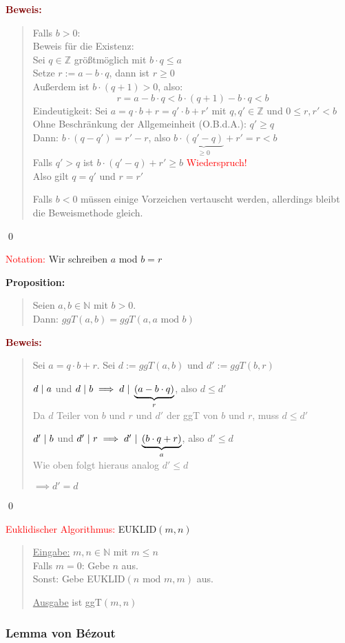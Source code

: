 \documentclass{article}
\newcommand{\smsp}{\phantom{\hspace{3px}}}
\newcommand{\red}[1]{\textcolor{red}{#1}}
\newcommand{\gray}[1]{\textcolor{gray}{#1}}
\newcommand{\dgr}[1]{\textcolor{dgr}{#1}}
\newcommand{\maroon}[1]{\textcolor{maroon}{#1}}
\newcommand{\prop}[1]{\dgr{\textbf{Proposition: }}\begin{quote}#1\end{quote}}
\newcommand{\pr}[1]{\maroon{\textbf{Beweis: }}\begin{quote}#1\end{quote}\qed}
\newcommand{\N}{\mathbb{N}}
\newcommand{\Z}{\mathbb{Z}}
\renewcommand{\st}{\smsp | \smsp}
\begin{document}
\pr{
    Falls $b > 0$:\\
    Beweis für die Existenz:\\
    Sei $q \in \Z$ größtmöglich mit $b \cdot q \leq a$\\
    Setze $r := a - b \cdot q$, dann ist $r \geq 0$\\
    Außerdem ist $b \cdot (q+1) > 0$, also:
    \[
        r = a - b \cdot q < b \cdot (q+1) - b \cdot q < b
    \]
    Eindeutigkeit: Sei $a = q \cdot b + r = q' \cdot b + r'$ mit $q, q' \in \Z$ und $0 \leq r,r' < b$\\
    Ohne Beschränkung der Allgemeinheit (O.B.d.A.): $q' \geq q$\\
    Dann: $b \cdot (q - q') = r' - r$, also $b \cdot \underbrace{(q' - q)}_{\geq 0} + r' = r < b$\\
    Falls $q' > q$ ist $b \cdot (q' - q) + r' \geq b$ \red{Wiederspruch!}\\
    Also gilt $q = q'$ und $r = r'$

    Falls $b < 0$ müssen einige Vorzeichen vertauscht werden, allerdings bleibt die Beweismethode gleich.
}

\red{Notation:} Wir schreiben $a$ mod $b = r$

\prop{
    Seien $a,b \in \N$ mit $b > 0$.\\
    Dann: $ggT(a,b) = ggT(a, a \text{ mod } b)$
}
\pr{
    Sei $a = q \cdot b + r$.
    Sei $d := ggT(a,b)$ und $d' := ggT(b,r)$

    $d \st a$ und $d \st b \implies d \st \underbrace{(a - b \cdot q)}_r$, also $d \leq d'$\\
    \gray{Da $d$ Teiler von $b$ und $r$ und $d'$ der ggT von $b$ und $r$, muss $d \leq d'$}
    
    $d' \st b$ und $d' \st r \implies d' \st \underbrace{(b \cdot q + r)}_a$, also $d' \leq d$\\
    \gray{Wie oben folgt hieraus analog $d' \leq d$}

    $\implies d' = d$
}

\red{Euklidischer Algorithmus:} EUKLID$(m,n)$
\begin{quote}
    \underline{Eingabe:} $m,n \in \N$ mit $m \leq n$\\
    Falls $m = 0$: Gebe $n$ aus.\\
    Sonst: Gebe EUKLID$(n \text{ mod } m, m)$ aus.

    \underline{Ausgabe} ist ggT$(m,n)$
\end{quote}

\subsubsection{Lemma von Bézout}
\end{document}
